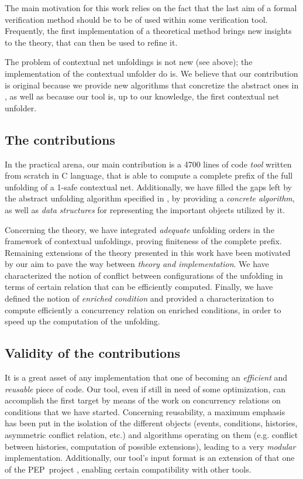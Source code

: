\documentclass[11pt,a4paper]{article}
\begin{document}
The main motivation for this work relies on the fact that the last aim of a
formal verification method should be to be of used within some verification
tool.  Frequently, the first implementation of a theoretical method brings new
insights to the theory, that can then be used to refine it.

The problem of contextual net unfoldings is not new (see above); the
implementation of the contextual unfolder do is.  We believe that our
contribution is original because we provide new algorithms that concretize the
abstract ones in , as well as because our tool is, up to our
knowledge, the first contextual net unfolder.

\subsection*{The contributions}

In the practical arena, our main contribution is a 4700 lines of code
\emph{tool} written from scratch in C language, that is able to compute a
complete prefix of the full unfolding of a 1-safe contextual net.
Additionally, we have filled the gaps left by the abstract unfolding algorithm
specified in , by providing a \emph{concrete algorithm}, as well
as \emph{data structures} for representing the important objects utilized by
it.

Concerning the theory, we have integrated \emph{adequate} unfolding orders
 in the framework of contextual unfoldings, proving finiteness of
the complete prefix.  Remaining extensions of the theory presented in this work
have been motivated by our aim to pave the way between \emph{theory and
implementation}.  We have characterized the notion of conflict between
configurations of the unfolding in terms of certain relation that can be
efficiently computed.  Finally, we have defined the notion of \emph{enriched
condition} and provided a characterization to compute efficiently a concurrency
relation on enriched conditions, in order to speed up the computation of the
unfolding.

\subsection*{Validity of the contributions}

It is a great asset of any implementation that one of becoming an
\emph{efficient} and \emph{reusable} piece of code.  Our tool, even if still in
need of some optimization, can accomplish the first target by means of the work
on concurrency relations on conditions that we have started.  Concerning
reusability, a maximum emphasis has been put in the isolation of the different
objects (events, conditions, histories, asymmetric conflict relation, etc.) and
algorithms operating on them (e.g. conflict between histories, computation of
possible extensions), leading to a very \emph{modular} implementation.
Additionally, our tool's input format is an extension of that one of the
PEP~project , enabling certain compatibility with other tools.
\end{document}
